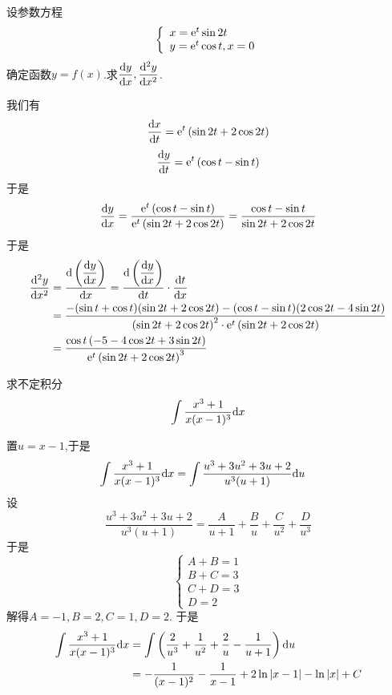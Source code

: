 \documentclass{ctexart}
\begin{document}
\begin{problem}[2.(10\songti 分)]
    设参数方程$$\left\{\begin{array}{l}x=\mathrm{e}^t\sin2t\\y=\mathrm{e}^t\cos t,x=0\end{array}\right.$$确定函数$y=f(x)$.求$\dfrac{\mathrm{d} y}{\mathrm{d} x},\dfrac{\mathrm{d}^2y}{\mathrm{d} x^2}$.
\end{problem}
\begin{solution}[Solution.]
    我们有
    $$\dfrac{\mathrm{d} x}{\mathrm{d} t}=\mathrm{e}^t\left(\sin2t+2\cos2t\right)$$
    $$\dfrac{\mathrm{d} y}{\mathrm{d} t}=\mathrm{e}^t\left(\cos t-\sin t\right)$$
    于是$$\dfrac{\mathrm{d} y}{\mathrm{d} x}=\dfrac{\mathrm{e}^t\left(\cos t-\sin t\right)}{\mathrm{e}^t\left(\sin2t+2\cos2t\right)}=\dfrac{\cos t-\sin t}{\sin2t+2\cos2t}$$
    于是$$\begin{aligned}
        \dfrac{\mathrm{d}^2y}{\mathrm{d} x^2}
        &= \dfrac{\mathrm{d}\left(\dfrac{\mathrm{d} y}{\mathrm{d} x}\right)}{\mathrm{d} x}=\dfrac{\mathrm{d}\left(\dfrac{\mathrm{d} y}{\mathrm{d} x}\right)}{\mathrm{d} t}\cdot\dfrac{\mathrm{d} t}{\mathrm{d} x} \\
        &= \dfrac{-(\sin t+\cos t)(\sin 2t+2\cos 2t)-(\cos t-\sin t)(2\cos2t-4\sin2t)}{\left(\sin2t+2\cos2t\right)^2\cdot\mathrm{e}^t\left(\sin2t+2\cos2t\right)} \\
        &= \dfrac{\cos t\left(-5-4\cos2t+3\sin2t\right)}{\mathrm{e}^t\left(\sin2t+2\cos2t\right)^3}
    \end{aligned}$$
\end{solution}
\begin{problem}[3.(10\songti 分)]
    求不定积分$$\int\dfrac{x^3+1}{x(x-1)^3}\mathrm{d} x$$
\end{problem}
\begin{solution}[Solution.]
    置$u=x-1$,于是
    $$\begin{aligned}
        \int\dfrac{x^3+1}{x(x-1)^3}\mathrm{d} x
        &= \int\dfrac{u^3+3u^2+3u+2}{u^3(u+1)}\mathrm{d} u
    \end{aligned}$$
    设$$\dfrac{u^3+3u^2+3u+2}{u^3(u+1)}=\dfrac{A}{u+1}+\dfrac{B}{u}+\dfrac{C}{u^2}+\dfrac{D}{u^3}$$
    于是$$\left\{\begin{array}{l}
        A+B=1\\
        B+C=3\\
        C+D=3\\
        D=2
    \end{array}\right.$$
    解得$A=-1,B=2,C=1,D=2$.
    于是$$\begin{aligned}
        \int\dfrac{x^3+1}{x(x-1)^3}\mathrm{d} x
        &= \int\left(\dfrac{2}{u^3}+\dfrac{1}{u^2}+\dfrac{2}{u}-\dfrac{1}{u+1}\right)\mathrm{d} u\\
        &= -\dfrac{1}{(x-1)^2}-\dfrac{1}{x-1}+2\ln\left|x-1\right|-\ln\left|x\right|+C
    \end{aligned}$$
\end{solution}
\end{document}
